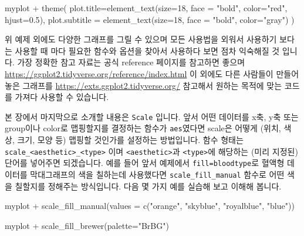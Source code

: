 \documentclass[
]{book}
\newenvironment{Shaded}{\begin{snugshade}}{\end{snugshade}}
\newcommand{\AttributeTok}[1]{\textcolor[rgb]{0.77,0.63,0.00}{#1}}
\newcommand{\DecValTok}[1]{\textcolor[rgb]{0.00,0.00,0.81}{#1}}
\newcommand{\FloatTok}[1]{\textcolor[rgb]{0.00,0.00,0.81}{#1}}
\newcommand{\FunctionTok}[1]{\textcolor[rgb]{0.00,0.00,0.00}{#1}}
\newcommand{\NormalTok}[1]{#1}
\newcommand{\SpecialCharTok}[1]{\textcolor[rgb]{0.00,0.00,0.00}{#1}}
\newcommand{\StringTok}[1]{\textcolor[rgb]{0.31,0.60,0.02}{#1}}
\begin{document}
\begin{Shaded}
\begin{Highlighting}[]
\NormalTok{myplot }\SpecialCharTok{+} 
  \FunctionTok{theme}\NormalTok{(}
    \AttributeTok{plot.title=}\FunctionTok{element\_text}\NormalTok{(}\AttributeTok{size=}\DecValTok{18}\NormalTok{, }\AttributeTok{face =} \StringTok{"bold"}\NormalTok{, }\AttributeTok{color=}\StringTok{"red"}\NormalTok{, }\AttributeTok{hjust=}\FloatTok{0.5}\NormalTok{),}
    \AttributeTok{plot.subtitle =} \FunctionTok{element\_text}\NormalTok{(}\AttributeTok{size=}\DecValTok{18}\NormalTok{, }\AttributeTok{face =} \StringTok{"bold"}\NormalTok{, }\AttributeTok{color=}\StringTok{"gray"}\NormalTok{)}
\NormalTok{    )}
\end{Highlighting}
\end{Shaded}

위 예제 외에도 다양한 그래프를 그릴 수 있으며 모든 사용법을 외워서 사용하기 보다는 사용할 때 마다 필요한 함수와 옵션을 찾아서 사용하다 보면 점차 익숙해질 것 입니다. 가장 정확한 참고 자료는 공식 reference 페이지를 참고하면 좋으며 \url{https://ggplot2.tidyverse.org/reference/index.html} 이 외에도 다른 사람들이 만들어 놓은 그래프를 \url{https://exts.ggplot2.tidyverse.org/} 참고해서 원하는 목적에 맞는 코드를 가져다 사용할 수 있습니다.

본 장에서 마지막으로 소개할 내용은 \texttt{Scale} 입니다. 앞서 어떤 데이터를 x축, y축 또는 group이나 color로 맵핑할지를 결정하는 함수가 \texttt{aes}였다면 scale은 어떻게 (위치, 색상, 크기, 모양 등) 맵핑할 것인가를 설정하는 방법입니다. 함수 형태는 \texttt{scale\_\textless{}aesthetic\textgreater{}\_\textless{}type\textgreater{}} 이며 \texttt{\textless{}aesthetic\textgreater{}}과 \texttt{\textless{}type\textgreater{}}에 해당하는 (미리 지정된) 단어를 넣어주면 되겠습니다. 예를 들어 앞서 예제에서 \texttt{fill=bloodtype}로 혈액형 데이터를 막대그래프의 색을 칠하는데 사용했다면 \texttt{scale\_fill\_manual} 함수로 어떤 색을 칠할지를 정해주는 방식입니다. 다음 몇 가지 예를 실습해 보고 이해해 봅니다.

\begin{Shaded}
\begin{Highlighting}[]
\NormalTok{myplot }\SpecialCharTok{+} 
  \FunctionTok{scale\_fill\_manual}\NormalTok{(}\AttributeTok{values =} \FunctionTok{c}\NormalTok{(}\StringTok{"orange"}\NormalTok{, }\StringTok{"skyblue"}\NormalTok{, }\StringTok{"royalblue"}\NormalTok{, }\StringTok{"blue"}\NormalTok{))}

\NormalTok{myplot }\SpecialCharTok{+} 
  \FunctionTok{scale\_fill\_brewer}\NormalTok{(}\AttributeTok{palette=}\StringTok{"BrBG"}\NormalTok{)}
\end{Highlighting}
\end{Shaded}
\end{document}
